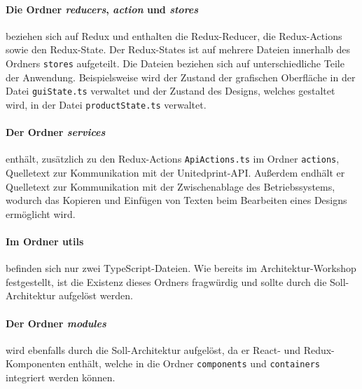 \paragraph{Die Ordner \emph{reducers}, \emph{action} und \emph{stores}} beziehen sich auf Redux und enthalten die Redux-Reducer, die Redux-Actions sowie den Redux-State. Der Redux-States ist auf mehrere Dateien innerhalb des Ordners \lstinline|stores| aufgeteilt. Die Dateien beziehen sich auf unterschiedliche Teile der Anwendung. Beispielsweise wird der Zustand der grafischen Oberfläche in der Datei \lstinline|guiState.ts| verwaltet und der Zustand des Designs, welches gestaltet wird, in der Datei \lstinline|productState.ts| verwaltet. 

\paragraph{Der Ordner \emph{services}} enthält, zusätzlich zu den Redux-Actions \lstinline|ApiActions.ts| im Ordner \lstinline|actions|,  Quelletext zur Kommunikation mit der Unitedprint-API. Außerdem endhält er Quelletext zur Kommunikation mit der Zwischenablage des Betriebssystems, wodurch das Kopieren und Einfügen von Texten beim Bearbeiten eines Designs ermöglicht wird.


\paragraph{Im Ordner utils} befinden sich nur zwei TypeScript-Dateien. Wie bereits im Architektur-Workshop festgestellt, ist die Existenz dieses Ordners fragwürdig und sollte durch die Soll-Architektur aufgelöst werden.  

\paragraph{Der Ordner \emph{modules}} wird ebenfalls durch die Soll-Architektur aufgelöst, da er React- und Redux-Komponenten enthält, welche in die Ordner \lstinline|components| und \lstinline|containers| integriert werden können.


